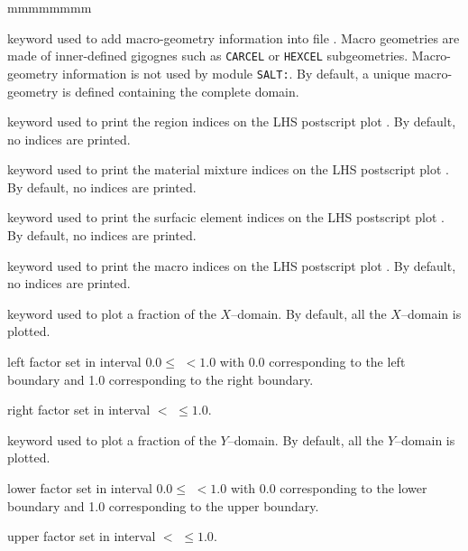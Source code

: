 \begin{ListeDeDescription}{mmmmmmmm}
\item[\moc{MACRO}] keyword used to add macro-geometry information into file . Macro geometries are made of inner-defined gigognes such as {\tt CARCEL}
or {\tt HEXCEL} subgeometries. Macro-geometry information is not used by module {\tt SALT:}. By default, a unique macro-geometry is defined containing the complete domain.

\item[\moc{DRAWNOD}] keyword used to print the region indices on the LHS postscript plot . By default, no indices are printed.

\item[\moc{DRAWMIX}] keyword used to print the material mixture indices on the LHS postscript plot . By default, no indices are printed.

\item[\moc{DRAWELEM}] keyword used to print the surfacic element indices on the LHS postscript plot . By default, no indices are printed.

\item[\moc{DRAWMACRO}] keyword used to print the macro indices on the LHS postscript plot . By default, no indices are printed.

\item[\moc{ZOOMX}] keyword used to plot a fraction of the $X$--domain. By default, all the $X$--domain is plotted.

\item[\dusa{facx1}] left factor set in interval $0.0 \le$  $< 1.0$ with 0.0 corresponding to the left boundary and 1.0 corresponding to the right boundary.

\item[\dusa{facx2}] right factor set in interval  $<$  $\le 1.0$.

\item[\moc{ZOOMY}] keyword used to plot a fraction of the $Y$--domain. By default, all the $Y$--domain is plotted.

\item[\dusa{facy1}] lower factor set in interval  $0.0 \le$  $< 1.0$ with 0.0 corresponding to the lower boundary and 1.0 corresponding to the upper boundary.

\item[\dusa{facy2}] upper factor set in interval  $<$  $\le 1.0$.

\end{ListeDeDescription}


\clearpage
